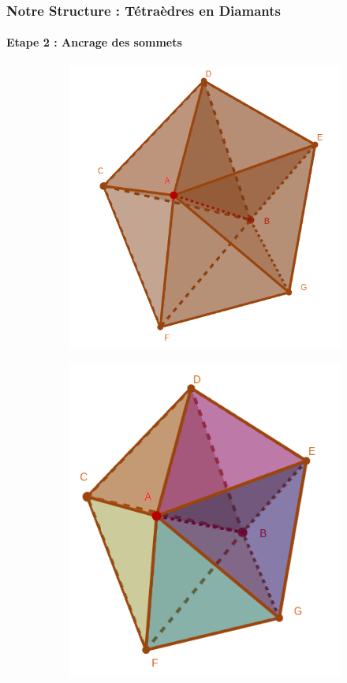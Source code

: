 \documentclass[9pt]{beamer}
\begin{document}
\begin{frame}
\small
\frametitle{Notre Structure : Tétraèdres en Diamants}
\framesubtitle{Etape 2 : Ancrage des sommets}
\begin{figure}[H]
\centering
\begin{subfigure}{.32\textwidth}
  \centering
  \includegraphics[scale=0.12]{Images/central_edge_AB}
  \caption{}
  \label{fig:central_edge_AB}
\end{subfigure}%
\begin{subfigure}{.32\textwidth}
  \centering
  \includegraphics[scale=0.16]{Images/explosion_diamond}

\end{subfigure}
\end{figure}
\end{frame}
\end{document}
